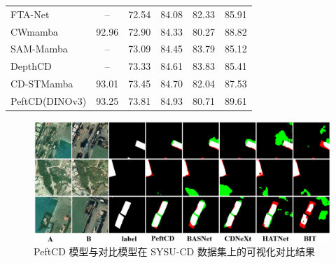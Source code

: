 \begin{table}[!htbp]
\begin{tabular}{l c c c c c}
FTA-Net~\cite{t_zhu_fta-net_2025}   & -- & 72.54 & 84.08 & 82.33 & 85.91 \\
CWmamba~\cite{Liu2025CWmambaLC} & 92.96 & 72.90 & 84.33 & 80.27 & 88.82 \\
SAM-Mamba~\cite{Li2025SAMMambaATC}  & -- & 73.09 & 84.45 & 83.79 & 85.12 \\
DepthCD~\cite{Zhou2025DepthCDDP}   & -- & 73.33 & 84.61 & 83.83 & 85.41 \\
CD-STMamba~\cite{Liu2025CDSTMambaTR} & 93.01 & 73.45 & 84.70 & 82.04 & 87.53 \\
\midrule
PeftCD(DINOv3)  & 93.25 & 73.81 & 84.93 & 80.71 & 89.61 \\
\bottomrule
\end{tabular}
\end{table}

\begin{figure}[!htbp]
  \centering
  \includegraphics[width=\textwidth]{paper_figures/基于AI基础模型微调的变化检测模型研究/PeftCD/peftcd_sysu.png}
  \caption{PeftCD 模型与对比模型在 SYSU-CD 数据集上的可视化对比结果}
  \label{fig:peftcd_sysu}
\end{figure}


